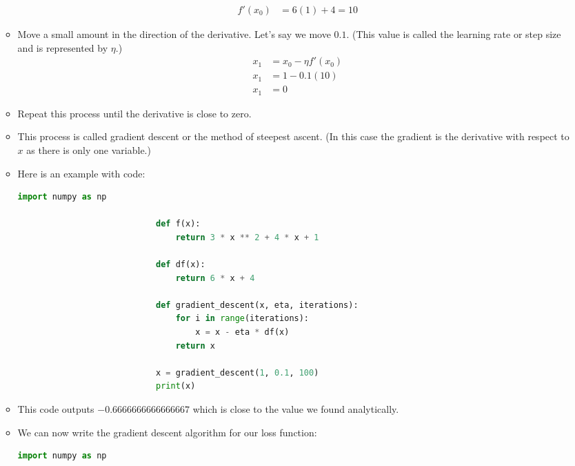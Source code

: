 \documentclass[12pt]{article}
\begin{document}
\begin{itemize}
\begin{itemize}
\begin{align*}
                            f'(x_0) &= 6(1) + 4 = 10
                        \end{align*}
                        \item Move a small amount in the direction of the derivative. Let's say we move $0.1$. (This value is called the learning rate or step size and is represented by $\eta$.)
                        \begin{align*}
                            x_1 &= x_0 - \eta f'(x_0)\\
                            x_1 &= 1 - 0.1(10)\\
                            x_1 &= 0
                        \end{align*}
                        \item Repeat this process until the derivative is close to zero.
                        \item This process is called gradient descent or the method of steepest ascent. (In this case the gradient is the derivative with respect to $x$ as there is only one variable.)
                        \item Here is an example with code:
                        \begin{lstlisting}[language=Python,gobble=28]
                            import numpy as np

                            def f(x):
                                return 3 * x ** 2 + 4 * x + 1

                            def df(x):
                                return 6 * x + 4

                            def gradient_descent(x, eta, iterations):
                                for i in range(iterations):
                                    x = x - eta * df(x)
                                return x

                            x = gradient_descent(1, 0.1, 100)
                            print(x)
                        \end{lstlisting}
                        \item This code outputs $-0.6666666666666667$ which is close to the value we found analytically.
                        \item We can now write the gradient descent algorithm for our loss function:
                        \begin{lstlisting}[language=Python,gobble=28]
                            import numpy as np


\end{lstlisting}
\end{itemize}
\end{itemize}
\end{document}
